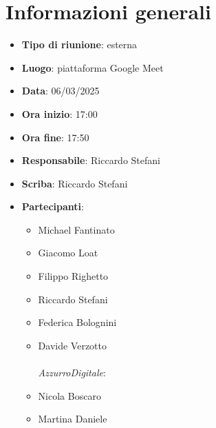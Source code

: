 


\section{Informazioni generali}

\begin{itemize}
    \item \textbf{Tipo di riunione}: esterna
    \item \textbf{Luogo}: piattaforma Google Meet
    \item \textbf{Data}: 06/03/2025
    \item \textbf{Ora inizio}: 17:00
    \item \textbf{Ora fine}: 17:50
    \item \textbf{Responsabile}: Riccardo Stefani
    \item \textbf{Scriba}: Riccardo Stefani
    \item \textbf{Partecipanti}:
    \begin{itemize}
        \item Michael Fantinato
        \item Giacomo Loat
        \item Filippo Righetto
        \item Riccardo Stefani
        \item Federica Bolognini
        \item Davide Verzotto \\ \\
        \emph{AzzurroDigitale}:
        \item Nicola Boscaro
        \item Martina Daniele
    \end{itemize}
\end{itemize}
